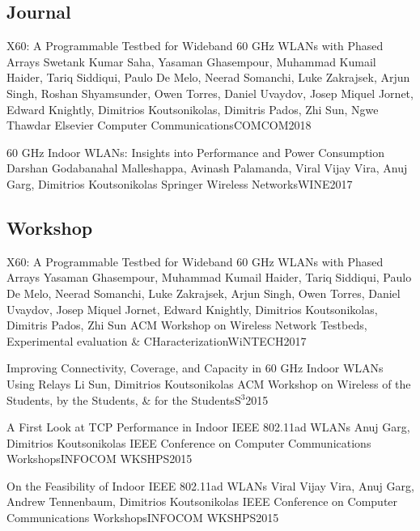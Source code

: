 
\subsection{Journal}
{X60: A Programmable Testbed for Wideband 60 GHz WLANs with Phased Arrays}
{Swetank Kumar Saha, Yasaman Ghasempour, Muhammad Kumail Haider, Tariq Siddiqui, Paulo De Melo, Neerad Somanchi, Luke Zakrajsek, Arjun Singh, Roshan Shyamsunder, Owen Torres, Daniel Uvaydov, Josep Miquel Jornet, Edward Knightly, Dimitrios Koutsonikolas, Dimitris Pados, Zhi Sun, Ngwe Thawdar}
{Elsevier Computer Communications}{COMCOM}{2018}

{60 GHz Indoor WLANs: Insights into Performance and Power Consumption}
{Darshan Godabanahal Malleshappa, Avinash Palamanda, Viral Vijay Vira, Anuj Garg, Dimitrios Koutsonikolas}
{Springer Wireless Networks}{WINE}{2017}

\subsection{Workshop}
{X60: A Programmable Testbed for Wideband 60 GHz WLANs with Phased Arrays}
{Yasaman Ghasempour, Muhammad Kumail Haider, Tariq Siddiqui, Paulo De Melo, Neerad Somanchi, Luke Zakrajsek, Arjun Singh, Owen Torres, Daniel Uvaydov, Josep Miquel Jornet, Edward Knightly, Dimitrios Koutsonikolas, Dimitris Pados, Zhi Sun}
{ACM Workshop on Wireless Network Testbeds, Experimental evaluation \& CHaracterization}{WiNTECH}{2017}

{Improving Connectivity, Coverage, and Capacity in 60 GHz Indoor WLANs Using Relays}
{Li Sun, Dimitrios Koutsonikolas}
{ACM Workshop on Wireless of the Students, by the Students, \& for the Students}{S$^3$}{2015}

{A First Look at TCP Performance in Indoor IEEE 802.11ad WLANs}
{Anuj Garg, Dimitrios Koutsonikolas}
{IEEE Conference on Computer Communications Workshops}{INFOCOM WKSHPS}{2015}

{On the Feasibility of Indoor IEEE 802.11ad WLANs}
{Viral Vijay Vira, Anuj Garg, Andrew Tennenbaum, Dimitrios Koutsonikolas}
{IEEE Conference on Computer Communications Workshops}{INFOCOM WKSHPS}{2015}

